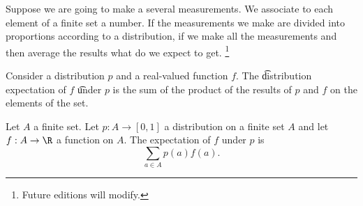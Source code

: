 

Suppose we are going to make a several measurements.
We associate to each element of a finite set a number.
If the measurements we make are divided into proportions according to a distribution, if we make all the measurements and then average the results what do we expect to get.
    \ifhmode\unskip\fi\footnote{
Future editions will modify.
    }


Consider a distribution $p$ and a real-valued function $f$.
The \t{distribution expectation} of $f$ \t{under} $p$ is the sum of the product of the results of $p$ and $f$ on the elements of the set.


Let $A$ a finite set.
Let $p: A \to [0, 1]$ a distribution on a finite set $A$ and let $f: A \to \R $ a function on $A$.
The expectation of $f$ under $p$ is
  \[
\sum_{a \in A} p(a) f(a).
  \]

\blankpage

